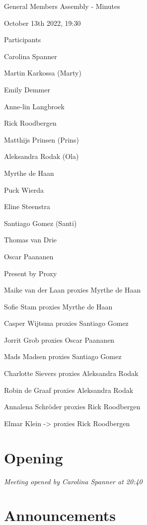 \documentclass[12pt, a4paper]{article}
\begin{document}
\centering

{\huge General Members Assembly - Minutes}

{\large October 13th 2022, 19:30}

\vspace{40pt}

\raggedright

{\large Participants}

Carolina Spanner

Martin Karkossa (Marty)

Emily Demmer

Anne-lin Langbroek

Rick Roodbergen

Matthijs Prinsen (Prins)

Aleksandra Rodak (Ola)

Myrthe de Haan

Puck Wierda

Eline Steenstra

Santiago Gomez (Santi)

Thomas van Drie

Oscar Paananen

\vspace{\baselineskip}
{\large Present by Proxy}

Maike van der Laan proxies Myrthe de Haan

Sofie Stam proxies Myrthe de Haan

Casper Wijtsma proxies Santiago Gomez

Jorrit Grob proxies Oscar Paananen

Mads Madsen proxies Santiago Gomez

Charlotte Sievers proxies Aleksandra Rodak

Robin de Graaf proxies Aleksandra Rodak

Annalena Schröder proxies Rick Roodbergen

Elmar Klein -> proxies Rick Roodbergen

\pagebreak
\tableofcontents
\pagebreak

\section{Opening}


\textit{Meeting opened by Carolina Spanner at 20:40}

\section{Announcements}
\end{document}
